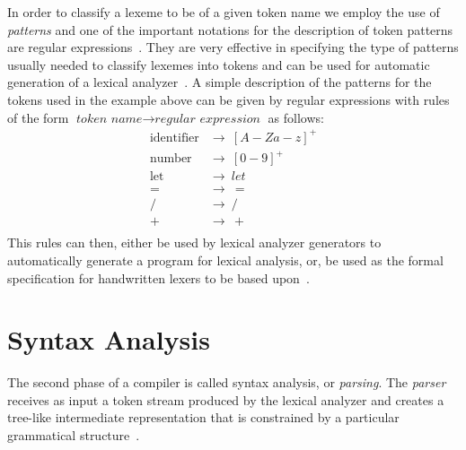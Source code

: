 \documentclass[
  oneside,
  english,
  coorientadorbanca,
  noabntexcite
]{ufsc-thesis-rn46-2019}
\begin{document}
In order to classify a lexeme to be of a given token name we employ the use of \textit{patterns} and one of the important notations for the description of token patterns are regular expressions~\cite{Aho:2006:CPT:1177220}.
They are very effective in specifying the type of patterns usually needed to classify lexemes into tokens and can be used for automatic generation of a lexical analyzer~\cite{Aho:2006:CPT:1177220}.
A simple description of the patterns for the tokens used in the example above can be given by regular expressions with rules of the form $\textit{token name} \rightarrow \textit{regular expression}$ as follows:
\begin{equation*}
  \begin{aligned}
    \textrm{identifier} & \rightarrow \ {[A-Za-z]}^+ \\
    \textrm{number}     & \rightarrow \ {[0-9]}^+    \\
    \textrm{let}        & \rightarrow \ let          \\
    =                   & \rightarrow \  =           \\
    /                   & \rightarrow \ /            \\
    +                   & \rightarrow \ +            \\
  \end{aligned}
\end{equation*}
This rules can then, either be used by lexical analyzer generators to automatically generate a program for lexical analysis, or, be used as the formal specification for handwritten lexers to be based upon~\cite{Aho:2006:CPT:1177220}.

\section{Syntax Analysis}\label{chapter:background:sec:syntax}

The second phase of a compiler is called syntax analysis, or \textit{parsing}.
The \textit{parser} receives as input a token stream produced by the lexical analyzer and creates a tree-like intermediate representation that is constrained by a particular grammatical structure~\cite{Aho:2006:CPT:1177220}.
\end{document}
